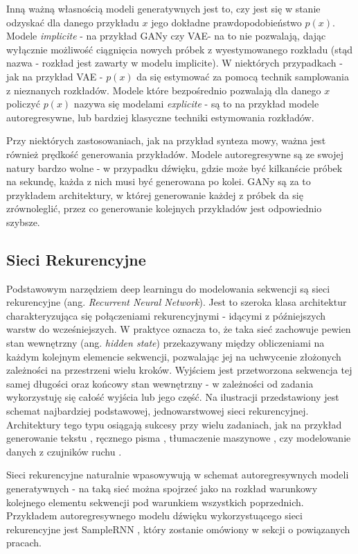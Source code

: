 \documentclass[magisterska]{pracamgr}
\renewcommand{\cite}{\citep}
\begin{document}
Inną ważną własnością modeli generatywnych jest to, czy jest się w stanie odzyskać dla danego przykładu $x$ jego dokładne prawdopodobieństwo $p(x)$. Modele \emph{implicite} - na przykład GANy czy VAE- na to nie pozwalają, dając wyłącznie możliwość ciągnięcia nowych próbek z wyestymowanego rozkładu (stąd nazwa - rozkład jest zawarty w modelu implicite). W niektórych przypadkach - jak na przykład VAE - $p(x)$ da się estymować za pomocą technik samplowania z nieznanych rozkładów. Modele które bezpośrednio pozwalają dla danego $x$ policzyć $p(x)$ nazywa się modelami \emph{explicite} - są to na przykład modele autoregresywne, lub bardziej klasyczne techniki estymowania rozkładów.

Przy niektórych zastosowaniach, jak na przykład synteza mowy, ważna jest również prędkość generowania przykładów. Modele autoregresywne są ze swojej natury bardzo wolne - w przypadku dźwięku, gdzie może być kilkanście próbek na sekundę, każda z nich musi być generowana po kolei. GANy są za to przykładem architektury, w której generowanie każdej z próbek da się zrównoleglić, przez co generowanie kolejnych przykładów jest odpowiednio szybsze.

\subsection{Sieci Rekurencyjne}

Podstawowym narzędziem deep learningu do modelowania sekwencji są sieci rekurencyjne (ang. \textit{Recurrent Neural Network}). Jest to szeroka klasa architektur charakteryzująca się połączeniami rekurencyjnymi - idącymi z późniejszych warstw do wcześniejszych. W praktyce oznacza to, że taka sieć zachowuje pewien stan wewnętrzny (ang. \textit{hidden state}) przekazywany między obliczeniami na każdym kolejnym elemencie sekwencji, pozwalając jej na uchwycenie złożonych zależności na przestrzeni wielu kroków. Wyjściem jest przetworzona sekwencja tej samej długości oraz końcowy stan wewnętrzny - w zależności od zadania wykorzystuję się całość wyjścia lub jego część. Na ilustracji przedstawiony jest schemat najbardziej podstawowej, jednowarstwowej sieci rekurencyjnej. Architektury tego typu osiągają sukcesy przy wielu zadaniach, jak na przykład generowanie tekstu \cite{hinton2011textrnn} \cite{graves2014textrnns}, ręcznego pisma \cite{graves2014textrnns}, tłumaczenie maszynowe \cite{kalchbrenner-blunsom-2013-recurrent}, czy modelowanie danych z czujników ruchu \cite{Sutskever2008trbm}.

Sieci rekurencyjne naturalnie wpasowywują w schemat autoregresywnych modeli generatywnych - na taką sieć można spojrzeć jako na rozkład warunkowy kolejnego elementu sekwencji pod warunkiem wszystkich poprzednich. Przykładem autoregresywnego modelu dźwięku wykorzystuącego sieci rekurencyjne jest SampleRNN \cite{mehri2017samplernn}, który zostanie omówiony w sekcji o powiązanych pracach.
\end{document}
